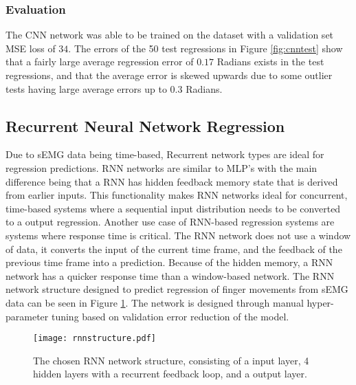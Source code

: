 \documentclass[../main.tex]{subfiles}
\begin{document}
\subsubsection{Evaluation}

The CNN network was able to be trained on the dataset with a validation set MSE loss of $34$.
The errors of the 50 test regressions in Figure \ref{fig:cnntest} show that a fairly large average regression error of $0.17$ Radians exists in the test regressions, and that the average error is skewed upwards due to some outlier tests having large average errors up to $0.3$ Radians.




\subsection{Recurrent Neural Network Regression}

Due to sEMG data being time-based, Recurrent network types are ideal for regression predictions.
RNN networks are similar to MLP's with the main difference being that a RNN has hidden feedback  memory state that is derived from earlier inputs.
This functionality makes RNN networks ideal for concurrent, time-based systems where a sequential input distribution needs to be converted to a output regression.  
Another use case of RNN-based regression systems are systems where response time is critical.
The RNN network does not use a window of data, it converts the input of the current time frame, and the feedback of the previous time frame into a prediction.
Because of the hidden memory, a RNN network has a quicker response time than a window-based network.
The RNN network structure designed to predict regression of finger movements from sEMG data can be seen in Figure \ref{fig:rnn_structure}.
The network is designed through manual hyper-parameter tuning based on validation error reduction of the model.



\begin{figure}[H]
\begin{center}
\texttt{[image: rnnstructure.pdf]}
\caption{The chosen RNN network structure, consisting of a input layer, 4 hidden layers with a recurrent feedback loop, and a output layer.}
\label{fig:rnn_structure}
\end{center}
\end{figure}
\end{document}
